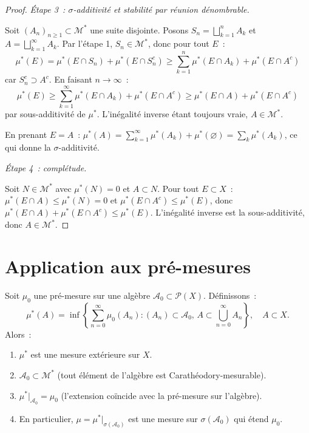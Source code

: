 \begin{proof}
\emph{\'Etape 3~: $\sigma$-additivit\'e et stabilit\'e par r\'eunion d\'enombrable.}

Soit $(A_n)_{n \geq 1} \subset \mathcal{M}^*$ une suite disjointe. Posons
$S_n = \bigsqcup_{k=1}^n A_k$ et $A = \bigsqcup_{k=1}^\infty A_k$. Par l'\'etape 1,
$S_n \in \mathcal{M}^*$, donc pour tout $E$~:
\[
\mu^*(E) = \mu^*(E \cap S_n) + \mu^*(E \cap S_n^c)
\geq \sum_{k=1}^n \mu^*(E \cap A_k) + \mu^*(E \cap A^c)
\]
car $S_n^c \supset A^c$. En faisant $n \to \infty$~:
\[
\mu^*(E) \geq \sum_{k=1}^{\infty} \mu^*(E \cap A_k) + \mu^*(E \cap A^c)
\geq \mu^*(E \cap A) + \mu^*(E \cap A^c)
\]
par sous-additivit\'e de $\mu^*$. L'in\'egalit\'e inverse \'etant toujours vraie,
$A \in \mathcal{M}^*$.

En prenant $E = A$~: $\mu^*(A) = \sum_{k=1}^{\infty} \mu^*(A_k) + \mu^*(\varnothing)
= \sum_k \mu^*(A_k)$, ce qui donne la $\sigma$-additivit\'e.

\emph{\'Etape 4~: compl\'etude.}

Soit $N \in \mathcal{M}^*$ avec $\mu^*(N) = 0$ et $A \subset N$. Pour tout
$E \subset X$~: $\mu^*(E \cap A) \leq \mu^*(N) = 0$ et $\mu^*(E \cap A^c) \leq
\mu^*(E)$, donc $\mu^*(E \cap A) + \mu^*(E \cap A^c) \leq \mu^*(E)$. L'in\'egalit\'e
inverse est la sous-additivit\'e, donc $A \in \mathcal{M}^*$.
\end{proof}

\section{Application aux pr\'e-mesures}

\begin{theoreme}
\label{thm:extension_caratheodory}
Soit $\mu_0$ une pr\'e-mesure sur une alg\`ebre $\mathcal{A}_0 \subset
\mathcal{P}(X)$. D\'efinissons~:
\[
\mu^*(A) = \inf\left\{\sum_{n=0}^{\infty} \mu_0(A_n) :
(A_n) \subset \mathcal{A}_0,\, A \subset \bigcup_{n=0}^{\infty} A_n\right\},
\quad A \subset X.
\]
Alors~:
\begin{enumerate}
    \item $\mu^*$ est une mesure ext\'erieure sur $X$.
    \item $\mathcal{A}_0 \subset \mathcal{M}^*$ (tout \'el\'ement de l'alg\`ebre est
    Carath\'eodory-mesurable).
    \item $\mu^*|_{\mathcal{A}_0} = \mu_0$ (l'extension co\"incide avec la
    pr\'e-mesure sur l'alg\`ebre).
    \item En particulier, $\mu = \mu^*|_{\sigma(\mathcal{A}_0)}$ est une mesure
    sur $\sigma(\mathcal{A}_0)$ qui \'etend $\mu_0$.
\end{enumerate}
\end{theoreme}

